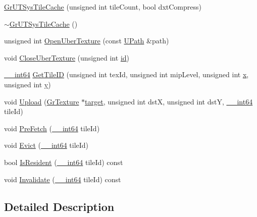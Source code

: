 \begin{CompactItemize}
\item 
\hyperlink{class_gr_u_t_sys_tile_cache_21adf6d6aceeaa392188406cc4f6862e}{GrUTSysTileCache} (unsigned int tileCount, bool dxtCompress)
\item 
\hyperlink{class_gr_u_t_sys_tile_cache_b4af6ca5eb48b3072c7748727d433c11}{$\sim$GrUTSysTileCache} ()
\item 
unsigned int \hyperlink{class_gr_u_t_sys_tile_cache_4da32a54ad566f5b56dc9f6883a714c6}{OpenUberTexture} (const \hyperlink{class_u_path}{UPath} \&path)
\item 
void \hyperlink{class_gr_u_t_sys_tile_cache_99709aa474875c406b71a3ea39b90e0b}{CloseUberTexture} (unsigned int \hyperlink{glext__bak_8h_58c2a664503e14ffb8f21012aabff3e9}{id})
\item 
\hyperlink{common__afx_8h_2e015c96ada30f1fdb9322f7af889c10}{\_\-\_\-int64} \hyperlink{class_gr_u_t_sys_tile_cache_0ade69d8a7eb2491b6c19b5dba8f1866}{GetTileID} (unsigned int texId, unsigned int mipLevel, unsigned int \hyperlink{wglext_8h_d77deca22f617d3f0e0eb786445689fc}{x}, unsigned int \hyperlink{wglext_8h_9298c7ad619074f5285b32c6b72bfdea}{y})
\item 
void \hyperlink{class_gr_u_t_sys_tile_cache_e62ec322ac0723cc5db77736e29e5b79}{Upload} (\hyperlink{class_gr_texture}{GrTexture} $\ast$\hyperlink{glext_8h_f9d0cbbbeb7414e786c41899e5a856d7}{target}, unsigned int dstX, unsigned int dstY, \hyperlink{common__afx_8h_2e015c96ada30f1fdb9322f7af889c10}{\_\-\_\-int64} tileId)
\item 
void \hyperlink{class_gr_u_t_sys_tile_cache_d6269bc51daf9f1913109a7bd5db8a02}{PreFetch} (\hyperlink{common__afx_8h_2e015c96ada30f1fdb9322f7af889c10}{\_\-\_\-int64} tileId)
\item 
void \hyperlink{class_gr_u_t_sys_tile_cache_66ecd3069a48c51e88582fc0383c3377}{Evict} (\hyperlink{common__afx_8h_2e015c96ada30f1fdb9322f7af889c10}{\_\-\_\-int64} tileId)
\item 
bool \hyperlink{class_gr_u_t_sys_tile_cache_d64362e1e41304db71b0804d7ea96c75}{IsResident} (\hyperlink{common__afx_8h_2e015c96ada30f1fdb9322f7af889c10}{\_\-\_\-int64} tileId) const 
\item 
void \hyperlink{class_gr_u_t_sys_tile_cache_3dec781213be39f8133dd38818ebf8fe}{Invalidate} (\hyperlink{common__afx_8h_2e015c96ada30f1fdb9322f7af889c10}{\_\-\_\-int64} tileId) const 
\end{CompactItemize}


\subsection{Detailed Description}



